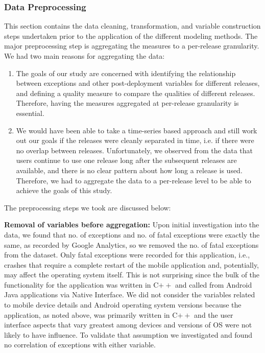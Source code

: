 \documentclass[smallcondensed]{svjour3}     %
\begin{document}
\subsubsection{Data Preprocessing}\label{s:datapre}

This section contains the data cleaning, transformation, and variable 
construction steps undertaken prior to the application of the different modeling 
methods. The major preprocessing step is aggregating the measures to a per-release 
granularity. We had two main reasons for aggregating the data:
\begin{enumerate}
\item The goals of our study are concerned with identifying the relationship between exceptions and other post-deployment variables for different releases, and defining a quality measure to compare the qualities of different releases. Therefore, having the measures aggregated at per-release granularity is essential.
\item We would have been able to take a time-series based approach and still work out our goals if the releases were cleanly separated in time, i.e. if there were no overlap between releases. Unfortunately, we observed from the data that users continue to use one release long after the subsequent releases are available, and there is no clear pattern about how long a release is used. Therefore, we had to aggregate the data to a per-release level to be able to achieve the goals of this study.
\end{enumerate}

The preprocessing steps we took are discussed below:

\textbf{Removal of variables before aggregation: } Upon initial
investigation into the data, we found that no. of exceptions and
no. of fatal exceptions were exactly the same, as recorded by Google
Analytics, so we removed the no. of fatal exceptions from the
dataset. Only fatal exceptions were recorded for this application,
i.e., crashes that require a complete restart of the mobile
application and, potentially, may affect the operating system
itself.  This is not surprising since the bulk of the functionality
for the application was written in C$++$ and called from Android
Java applications via Native Interface.
We did not consider the variables related to mobile device
details and Android operating system versions because the
application, as noted above, was primarily written in C$++$ and the
user interface aspects that vary greatest among devices and versions
of OS were not likely to have influence. To validate that
assumption we investigated and found no
correlation of exceptions with either variable. 
\end{document}
